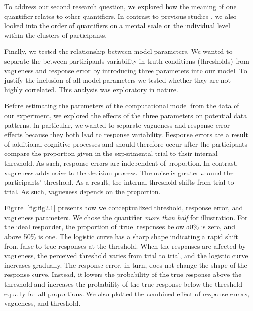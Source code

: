\documentclass{article}
\begin{document}
To address our second research question, we explored how the meaning of one quantifier relates to other quantifiers. %
In contrast to previous studies \cite{Hammerton1976HowPart, Heim2015Ifmany, Newstead1987TheScales, Pezzelle2018, vanTiel2021ProbabilisticQuantification}, we also looked into the order of quantifiers on a mental scale on the individual level within the clusters of participants.

Finally, we tested the relationship between model parameters. We wanted to separate the between-participants variability in truth conditions (thresholds) from vagueness and response error by introducing three parameters into our model. To justify the inclusion of all model parameters we tested whether they are not highly correlated. %
This analysis was exploratory in nature. 

Before estimating the parameters of the computational model from the data of our experiment, we explored the effects of the three parameters on potential data patterns. In particular, we wanted to separate vagueness and response error effects because they both lead to response variability. Response errors are a result of additional cognitive processes and should therefore occur after the participants compare the proportion given in the experimental trial to their internal threshold. As such, response errors are independent of proportion. In contrast, vagueness adds noise to the decision process. The noise is greater around the participants' threshold. As a result, the internal threshold shifts from trial-to-trial. As such, vagueness depends on the proportion. 

Figure~\ref{fig:fig2.1} presents how we conceptualized threshold, response error, and vagueness parameters. We chose the quantifier \textit{more than half} for illustration. For the ideal responder, the proportion of `true' responses below 50\% is zero, and above 50\% is one. The logistic curve has a sharp shape indicating a rapid shift from false to true responses at the threshold. When the responses are affected by vagueness, the perceived threshold varies from trial to trial, and the logistic curve increases gradually. The response error, in turn, does not change the shape of the response curve. Instead, it lowers the probability of the true response above the threshold and increases the probability of the true response below the threshold equally for all proportions. We also plotted the combined effect of response errors, vagueness, and threshold.
\end{document}
